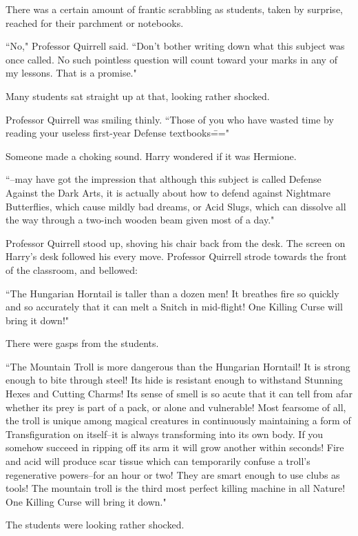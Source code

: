 There was a certain amount of frantic scrabbling as students, taken by surprise, reached for their parchment or notebooks.

``No," Professor Quirrell said. ``Don't bother writing down what this subject was once called. No such pointless question will count toward your marks in any of my lessons. That is a promise."

Many students sat straight up at that, looking rather shocked.

Professor Quirrell was smiling thinly. ``Those of you who have wasted time by reading your useless first-year Defense textbooks\==="

Someone made a choking sound. Harry wondered if it was Hermione.

``\---may have got the impression that although this subject is called Defense Against the Dark Arts, it is actually about how to defend against Nightmare Butterflies, which cause mildly bad dreams, or Acid Slugs, which can dissolve all the way through a two-inch wooden beam given most of a day."

Professor Quirrell stood up, shoving his chair back from the desk. The screen on Harry's desk followed his every move. Professor Quirrell strode towards the front of the classroom, and bellowed:

``The Hungarian Horntail is taller than a dozen men! It breathes fire so quickly and so accurately that it can melt a Snitch in mid-flight! One Killing Curse will bring it down!"

There were gasps from the students.

``The Mountain Troll is more dangerous than the Hungarian Horntail! It is strong enough to bite through steel! Its hide is resistant enough to withstand Stunning Hexes and Cutting Charms! Its sense of smell is so acute that it can tell from afar whether its prey is part of a pack, or alone and vulnerable! Most fearsome of all, the troll is unique among magical creatures in continuously maintaining a form of Transfiguration on itself\---it is always transforming into its own body. If you somehow succeed in ripping off its arm it will grow another within seconds! Fire and acid will produce scar tissue which can temporarily confuse a troll's regenerative powers\---for an hour or two! They are smart enough to use clubs as tools! The mountain troll is the third most perfect killing machine in all Nature! One Killing Curse will bring it down."

The students were looking rather shocked.

